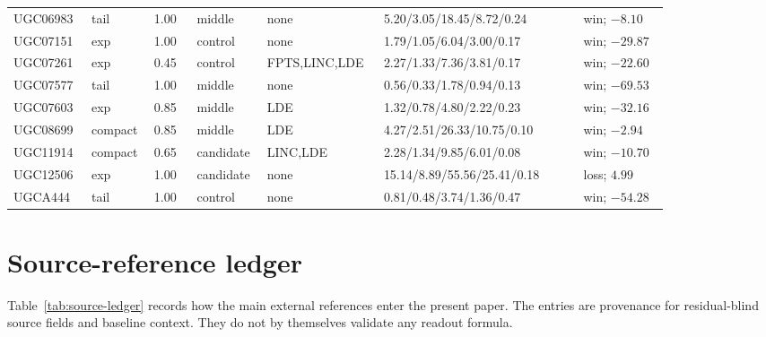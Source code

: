 \documentclass[11pt]{article}
\begin{document}
\begin{landscape}
\begin{longtable}{@{}p{0.105\linewidth}p{0.070\linewidth}p{0.060\linewidth}p{0.085\linewidth}p{0.130\linewidth}p{0.280\linewidth}p{0.120\linewidth}@{}}
UGC06983 & tail & 1.00 & middle & none & 5.20/3.05/18.45/8.72/0.24 & win; $-8.10$ \\
UGC07151 & exp & 1.00 & control & none & 1.79/1.05/6.04/3.00/0.17 & win; $-29.87$ \\
UGC07261 & exp & 0.45 & control & FPTS,LINC,LDE & 2.27/1.33/7.36/3.81/0.17 & win; $-22.60$ \\
UGC07577 & tail & 1.00 & middle & none & 0.56/0.33/1.78/0.94/0.13 & win; $-69.53$ \\
UGC07603 & exp & 0.85 & middle & LDE & 1.32/0.78/4.80/2.22/0.23 & win; $-32.16$ \\
UGC08699 & compact & 0.85 & middle & LDE & 4.27/2.51/26.33/10.75/0.10 & win; $-2.94$ \\
UGC11914 & compact & 0.65 & candidate & LINC,LDE & 2.28/1.34/9.85/6.01/0.08 & win; $-10.70$ \\
UGC12506 & exp & 1.00 & candidate & none & 15.14/8.89/55.56/25.41/0.18 & loss; $4.99$ \\
UGCA444 & tail & 1.00 & control & none & 0.81/0.48/3.74/1.36/0.47 & win; $-54.28$ \\
\end{longtable}
\endgroup
\end{landscape}

\section{Source-reference ledger}

Table~\ref{tab:source-ledger} records how the main external references enter the
present paper.  The entries are provenance for residual-blind source fields and
baseline context.  They do not by themselves validate any readout formula.
\end{document}
